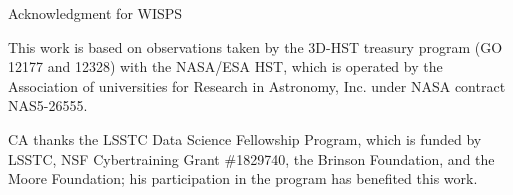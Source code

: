 \documentclass[manuscript]{aastex}
\begin{document}
\acknowledgements
{\color{green} Acknowledgment for WISPS}

This work is based on observations taken by the 3D-HST treasury program (GO 12177 and 12328) with the NASA/ESA HST, which is operated by the Association of universities for Research in Astronomy, Inc. under NASA contract NAS5-26555.

CA thanks the LSSTC Data Science Fellowship Program, which is funded by LSSTC, NSF Cybertraining Grant \#1829740, the Brinson Foundation, and the Moore Foundation; his participation in the program has benefited this work.

\clearpage





 
\end{document}
